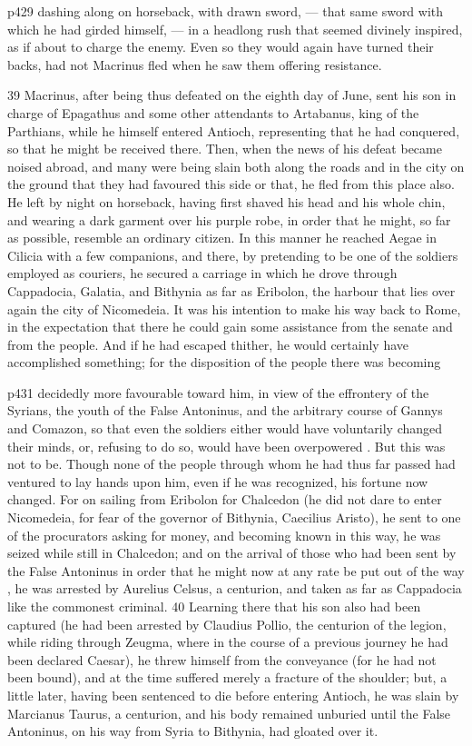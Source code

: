 p429 dashing along on horseback, with drawn sword, \texthebrew{—} that same sword with which he had girded himself, \texthebrew{—} in a headlong rush that seemed divinely inspired, as if about to charge the enemy. Even so they would again have turned their backs, had not Macrinus fled when he saw them offering resistance.

39
Macrinus, after being thus defeated on the eighth day of June, sent his son in charge of Epagathus and some other attendants to Artabanus, king of the Parthians, while he himself entered Antioch, representing that he had conquered, so that he might be received there. Then, when the news of his defeat became noised abroad, and many were being slain both along the roads and in the city on the ground that they had favoured this side or that, he fled from this place also. He left by night on horseback, having first shaved his head and his whole chin, and wearing a dark garment over his purple robe, in order that he might, so far as possible, resemble an ordinary citizen. In this manner he reached Aegae in Cilicia with a few companions, and there, by pretending to be one of the soldiers employed as couriers, he secured a carriage in which he drove through Cappadocia, Galatia, and Bithynia as far as Eribolon, the harbour that lies over again the city of Nicomedeia. It was his intention to make his way back to Rome, in the expectation that there he could gain some assistance from the senate and from the people. And if he had escaped thither, he would certainly have accomplished something; for the disposition of the people there was becoming

p431 decidedly more favourable toward him, in view of the effrontery of the Syrians, the youth of the False Antoninus, and the arbitrary course of Gannys and Comazon, so that even the soldiers either would have voluntarily changed their minds, or, refusing to do so, would have been over­powered . But this was not to be. Though none of the people through whom he had thus far passed had ventured to lay hands upon him, even if he was recognized, his fortune now changed. For on sailing from Eribolon for Chalcedon (he did not dare to enter Nicomedeia, for fear of the governor of Bithynia, Caecilius Aristo), he sent to one of the procurators asking for money, and becoming known in this way, he was seized while still in Chalcedon; and on the arrival of those who had been sent by the False Antoninus in order that he might now at any rate be put out of the way , he was arrested by Aurelius Celsus, a centurion, and taken as far as Cappadocia like the commonest criminal. 40
Learning there that his son also had been captured (he had been arrested by Claudius Pollio, the centurion of the legion, while riding through Zeugma, where in the course of a previous journey he had been declared Caesar), he threw himself from the conveyance (for he had not been bound), and at the time suffered merely a fracture of the shoulder; but, a little later, having been sentenced to die before entering Antioch, he was slain by Marcianus Taurus, a centurion, and his body remained unburied until the False Antoninus, on his way from Syria to Bithynia, had gloated over it.

